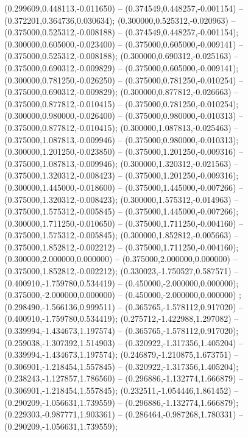  (0.299609,0.448113,-0.011650) -- (0.374549,0.448257,-0.001154) -- (0.372201,0.364736,0.030634);
 (0.300000,0.525312,-0.020963) -- (0.375000,0.525312,-0.008188) -- (0.374549,0.448257,-0.001154);
 (0.300000,0.605000,-0.023400) -- (0.375000,0.605000,-0.009141) -- (0.375000,0.525312,-0.008188);
 (0.300000,0.690312,-0.025163) -- (0.375000,0.690312,-0.009829) -- (0.375000,0.605000,-0.009141);
 (0.300000,0.781250,-0.026250) -- (0.375000,0.781250,-0.010254) -- (0.375000,0.690312,-0.009829);
 (0.300000,0.877812,-0.026663) -- (0.375000,0.877812,-0.010415) -- (0.375000,0.781250,-0.010254);
 (0.300000,0.980000,-0.026400) -- (0.375000,0.980000,-0.010313) -- (0.375000,0.877812,-0.010415);
 (0.300000,1.087813,-0.025463) -- (0.375000,1.087813,-0.009946) -- (0.375000,0.980000,-0.010313);
 (0.300000,1.201250,-0.023850) -- (0.375000,1.201250,-0.009316) -- (0.375000,1.087813,-0.009946);
 (0.300000,1.320312,-0.021563) -- (0.375000,1.320312,-0.008423) -- (0.375000,1.201250,-0.009316);
 (0.300000,1.445000,-0.018600) -- (0.375000,1.445000,-0.007266) -- (0.375000,1.320312,-0.008423);
 (0.300000,1.575312,-0.014963) -- (0.375000,1.575312,-0.005845) -- (0.375000,1.445000,-0.007266);
 (0.300000,1.711250,-0.010650) -- (0.375000,1.711250,-0.004160) -- (0.375000,1.575312,-0.005845);
 (0.300000,1.852812,-0.005663) -- (0.375000,1.852812,-0.002212) -- (0.375000,1.711250,-0.004160);
 (0.300000,2.000000,0.000000) -- (0.375000,2.000000,0.000000) -- (0.375000,1.852812,-0.002212);
 (0.330023,-1.750527,0.587571) -- (0.400910,-1.759780,0.534419) -- (0.450000,-2.000000,0.000000);
 (0.375000,-2.000000,0.000000) -- (0.450000,-2.000000,0.000000) ;
 (0.298490,-1.566136,0.999511) -- (0.365765,-1.578112,0.917020) -- (0.400910,-1.759780,0.534419);
 (0.275712,-1.422988,1.297082) -- (0.339994,-1.434673,1.197574) -- (0.365765,-1.578112,0.917020);
 (0.259038,-1.307392,1.514903) -- (0.320922,-1.317356,1.405204) -- (0.339994,-1.434673,1.197574);
 (0.246879,-1.210875,1.673751) -- (0.306901,-1.218454,1.557845) -- (0.320922,-1.317356,1.405204);
 (0.238243,-1.127857,1.786560) -- (0.296886,-1.132774,1.666879) -- (0.306901,-1.218454,1.557845);
 (0.232511,-1.054446,1.861452) -- (0.290209,-1.056631,1.739559) -- (0.296886,-1.132774,1.666879);
 (0.229303,-0.987771,1.903361) -- (0.286464,-0.987268,1.780331) -- (0.290209,-1.056631,1.739559);
